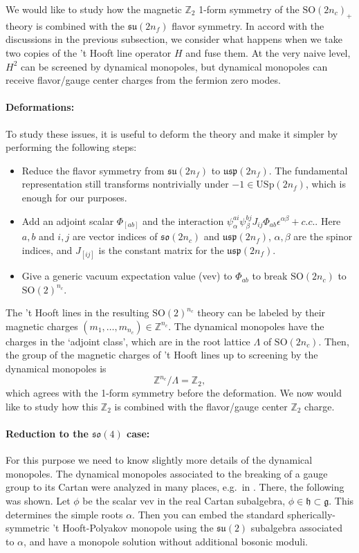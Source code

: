 \documentclass[12pt]{article}
\numberwithin{equation}{section}
\def\bZ{\mathbb{Z}}
\def\SO{\mathrm{SO}}
\def\USp{\mathrm{USp}}
\def\su{\mathfrak{su}}
\def\so{\mathfrak{so}}
\def\usp{\mathfrak{usp}}
\begin{document}
We would like to study how the magnetic $\bZ_2$ 1-form symmetry of the $\SO(2n_c)_+$ theory is combined with the $\su(2n_f)$ flavor symmetry.
In accord with the discussions in the previous subsection, 
we consider what happens when we take two copies of the 't Hooft line operator $H$ and fuse them.
At the very naive level, $H^2$ can be screened by dynamical monopoles,
but dynamical monopoles can receive flavor/gauge center charges from the fermion zero modes.

\paragraph{Deformations:}
To study these issues, it is useful to deform the theory and make it simpler
by performing the following steps:
\begin{itemize}
\item Reduce the flavor symmetry from $\su(2n_f)$ to $\usp(2n_f)$. 
The fundamental representation still transforms nontrivially under $-1\in \USp(2n_f)$, which is enough for our purposes.
\item Add an adjoint scalar $\Phi_{[ab]}$ and the interaction $\psi^{ai}_\alpha \psi^{bj}_\beta J_{ij} \Phi_{ab}\epsilon^{\alpha\beta} +c.c.$.
Here $a,b$ and $i,j$ are vector indices of $\so(2n_c)$ and $\usp(2n_f)$,
$\alpha,\beta$ are the spinor indices,
and  $J_{[ij]}$ is the constant matrix for the $\usp(2n_f)$.
\item Give a generic vacuum expectation value (vev) to $\Phi_{ab}$ to break $\SO(2n_c)$ to $\SO(2)^{n_c}$.
\end{itemize}

The 't Hooft lines in the resulting $\SO(2)^{n_c}$ theory can be labeled by their magnetic charges $(m_1,\ldots,m_{n_c})\in \bZ^{n_c}$.
The dynamical monopoles have the charges in the `adjoint class', which are
in the root lattice $\Lambda$ of $\SO(2n_c)$. 
Then, the group of the magnetic charges of 't Hooft lines up to screening by the dynamical monopoles is \begin{equation}
\bZ^{n_c}/\Lambda = \bZ_2,
\end{equation}
which agrees with the 1-form symmetry before the deformation.
We now would like to study how this $\bZ_2$ is combined with the flavor/gauge center $\bZ_2$ charge.

\paragraph{Reduction to  the $\so(4)$ case:}
For this purpose we need to know slightly more details of the dynamical monopoles.
The dynamical monopoles associated to the breaking of a gauge group to its Cartan were analyzed in many places, 
e.g.~in \cite{Weinberg:1979zt}.
There, the following was shown.
Let $\phi$ be the scalar vev in the real Cartan subalgebra, $\phi\in \mathfrak{h}\subset \mathfrak{g}$.
This determines the simple roots $\alpha$.
Then you can embed the standard spherically-symmetric 't Hooft-Polyakov monopole
using the $\mathfrak{su}(2)$ subalgebra associated to $\alpha$,
and have a monopole solution without additional bosonic moduli. 
\end{document}
